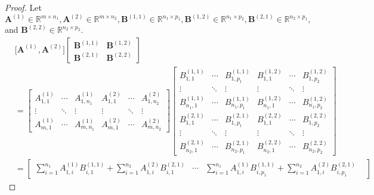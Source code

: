 \documentclass{article}
\theoremstyle{plain}
\begin{document}
\begin{proof}
	Let
	\begin{math}
		\bm{A}^{(1)} \in \mathbb{R}^{m \times n_1} , \bm{A}^{(2)} \in \mathbb{R}^{m \times n_2} ,
		\bm{B}^{(1,1)} \in \mathbb{R}^{n_1 \times p_1} , \bm{B}^{(1,2)} \in \mathbb{R}^{n_1 \times p_2} ,
        \bm{B}^{(2,1)} \in \mathbb{R}^{n_2 \times p_1} ,
	\end{math}
	and
	\begin{math}
		\bm{B}^{(2,2)} \in \mathbb{R}^{n_2 \times p_2} .
	\end{math}
	\footnotesize
	\begin{equation*}
		\begin{split}
			&\lbrack \bm{A}^{(1)} , \bm{A}^{(2)} \rbrack
		    \begin{bmatrix}
			    \bm{B}^{(1,1)} & \bm{B}^{(1,2)} \\
			    \bm{B}^{(2,1)} & \bm{B}^{(2,2)}
		    \end{bmatrix} \\
			&=
			\begin{bmatrix}
				A_{1,1}^{(1)} & \cdots & A_{1,n_1}^{(1)} & A_{1,1}^{(2)} & \cdots & A_{1,n_2}^{(2)} \\
				\vdots & \ddots & \vdots & \vdots & \ddots & \vdots \\
				A_{m,1}^{(1)} & \cdots & A_{m,n_1}^{(1)} & A_{m,1}^{(2)} & \cdots & A_{m,n_2}^{(2)}
			\end{bmatrix}
			\begin{bmatrix}
				B_{1,1}^{(1,1)} & \cdots & B_{1,p_1}^{(1,1)} & B_{1,1}^{(1,2)} & \cdots & B_{1,p_2}^{(1,2)} \\
				\vdots & \ddots & \vdots & \vdots & \ddots & \vdots \\
				B_{n_1,1}^{(1,1)} & \cdots & B_{n_1,p_1}^{(1,1)} & B_{n_1,1}^{(1,2)} & \cdots & B_{n_1,p_2}^{(1,2)} \\
				B_{1,1}^{(2,1)} & \cdots & B_{1,p_1}^{(2,1)} & B_{1,1}^{(2,2)} & \cdots & B_{1,p_2}^{(2,2)} \\
				\vdots & \ddots & \vdots & \vdots & \ddots & \vdots \\
				B_{n_2,1}^{(2,1)} & \cdots & B_{n_2,p_1}^{(2,1)} & B_{n_2,1}^{(2,2)} & \cdots & B_{n_2,p_2}^{(2,2)}
			\end{bmatrix} \\
			&=
			\begin{bmatrix}
				\sum\limits_{i=1}^{n_1} A_{1,i}^{(1)} B_{i,1}^{(1,1)} + \sum\limits_{i=1}^{n_2} A_{1,i}^{(2)} B_{i,1}^{(2,1)} &
				\cdots &
				\sum\limits_{i=1}^{n_1} A_{1,i}^{(1)} B_{i,p_1}^{(1,1)} + \sum\limits_{i=1}^{n_2} A_{1,i}^{(2)} B_{i,p_1}^{(2,1)} &

\end{bmatrix}
\end{split}
\end{equation*}
\end{proof}
\end{document}
